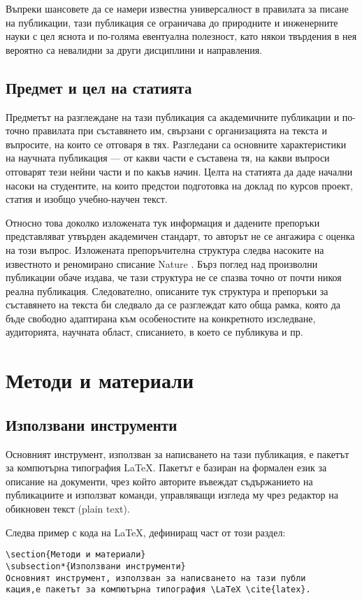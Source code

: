 \documentclass[11pt, oneside]{article}     %
\begin{document}
Въпреки шансовете да се намери известна универсалност в правилата за писане на публикации, тази публикация се ограничава до природните и инженерните науки с цел яснота и по-голяма евентуална полезност, като някои твърдения в нея вероятно са невалидни за други дисциплини и направления.
 
\subsection*{Предмет и цел на статията}

Предметът на разглеждане на тази публикация са академичните публикации и по-точно правилата при съставянето им, свързани с организацията на текста и въпросите, на които се отговаря в тях. Разгледани са основните характеристики на научната публикация --- от какви части е съставена тя, на какви въпроси отговарят тези нейни части и по какъв начин. Целта на статията да даде начални насоки на студентите, на които предстои подготовка на доклад по курсов проект, статия и изобщо учебно-научен текст.

Относно това доколко изложената тук информация и дадените препоръки представляват утвърден академичен стандарт, то авторът не се ангажира с оценка на този въпрос. Изложената препоръчителна структура следва насоките на известното и реномирано списание Nature \cite{nature}. Бърз поглед над произволни публикации обаче издава, че тази структура не се спазва точно от почти никоя реална публикация. Следователно, описаните тук структура и препоръки за съставянето на текста би следвало да се разглеждат като обща рамка, която да бъде свободно адаптирана към особеностите на конкретното изследване, аудиторията, научната област, списанието, в което се публикува и пр.

\section{Методи и материали}
\subsection*{Използвани инструменти}
Основният инструмент, използван за написването на тази публикация, е пакетът за компютърна типография \LaTeX \cite{latex}. Пакетът е базиран на формален език за описание на документи, чрез който авторите въвеждат съдържанието на публикациите и използват команди, управляващи изгледа му чрез редактор на обикновен текст (plain text).

Следва пример с кода на \LaTeX, дефиниращ част от този раздел:
\begin{Verbatim}[frame=single]
\section{Методи и материали}
\subsection*{Използвани инструменти}
Основният инструмент, използван за написването на тази публи
кация,е пакетът за компютърна типография \LaTeX \cite{latex}.
\end{Verbatim}
\end{document}
